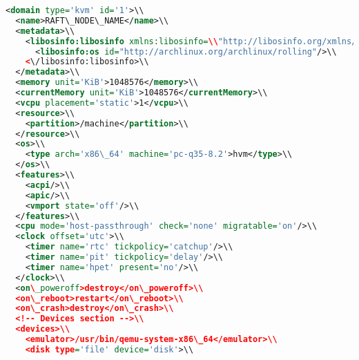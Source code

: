 \begin{lstlisting}[language=XML]
<domain type='kvm' id='1'>\\
  <name>RAFT\_NODE\_NAME</name>\\
  <metadata>\\
    <libosinfo:libosinfo xmlns:libosinfo=\\"http://libosinfo.org/xmlns/libvirt/domain/1.0">\\
      <libosinfo:os id="http://archlinux.org/archlinux/rolling"/>\\
    <\/libosinfo:libosinfo>\\
  </metadata>\\
  <memory unit='KiB'>1048576</memory>\\
  <currentMemory unit='KiB'>1048576</currentMemory>\\
  <vcpu placement='static'>1</vcpu>\\
  <resource>\\
    <partition>/machine</partition>\\
  </resource>\\
  <os>\\
    <type arch='x86\_64' machine='pc-q35-8.2'>hvm</type>\\
  </os>\\
  <features>\\
    <acpi/>\\
    <apic/>\\
    <vmport state='off'/>\\
  </features>\\
  <cpu mode='host-passthrough' check='none' migratable='on'/>\\
  <clock offset='utc'>\\
    <timer name='rtc' tickpolicy='catchup'/>\\
    <timer name='pit' tickpolicy='delay'/>\\
    <timer name='hpet' present='no'/>\\
  </clock>\\
  <on\_poweroff>destroy</on\_poweroff>\\
  <on\_reboot>restart</on\_reboot>\\
  <on\_crash>destroy</on\_crash>\\
  <!-- Devices section -->\\
  <devices>\\
    <emulator>/usr/bin/qemu-system-x86\_64</emulator>\\
    <disk type='file' device='disk'>\\

\end{lstlisting}
